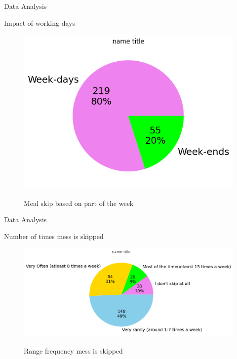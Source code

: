 \documentclass{beamer}
\begin{document}
\begin{frame}{Data Analysis}
\begin{block}{Impact of working days}
\begin{figure}
      \centering
    \caption{Meal skip based on part of the week }
    \includegraphics[scale = 0.55]{pie_plot_weekdays.png}  
    \label{pie_weekdays}
\end{figure}
\end{block}
\end{frame}
\begin{frame}{Data Analysis}
\begin{block}{Number of times mess is skipped}
\begin{figure}
      \centering
    \caption{Range frequency mess is skipped }
    \includegraphics[scale = 0.55]{pie_skip_categoty.png}  
    \label{pie_skip}
\end{figure}
\end{block}
\end{frame}
\end{document}
